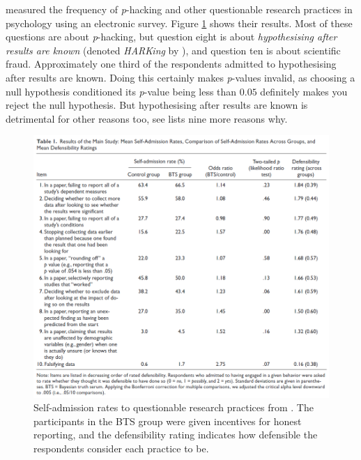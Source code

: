 \textcite{John2012-xp} measured the frequency of \emph{p}-hacking and other questionable research practices in psychology using an electronic survey. Figure \ref{fig:john2012} shows their results. Most of these questions are about \emph{p}-hacking, but question eight is about \emph{hypothesising after results are known} (denoted \emph{HARKing} by \textcite{Kerr1998-by}), and question ten is about scientific fraud. Approximately one third of the respondents admitted to hypothesising after results are known. Doing this certainly makes \emph{p}-values invalid, as choosing a null hypothesis conditioned its \emph{p}-value being less than $0.05$ definitely makes you reject the null hypothesis. But hypothesising after results are known is detrimental for other reasons too, see \textcite[p. 205]{Kerr1998-by} lists nine more reasons why.

\begin{figure}
\noindent \begin{centering}
\includegraphics[scale=0.4]{chunks/john2012}
\par\end{centering}
\caption{\label{fig:john2012}Self-admission rates to questionable research practices from \textcite{John2012-xp}. The participants in the BTS group were given incentives for honest reporting, and the defensibility rating indicates how defensible the respondents consider each practice to be.}
\end{figure}

